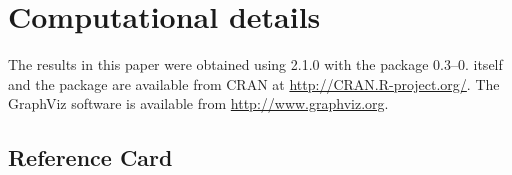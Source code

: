 \documentclass{Z}
\begin{document}
\section*{Computational details}

The results in this paper were obtained using  2.1.0 with
the package  0.3--0.  itself and the
 package are available from CRAN at
\url{http://CRAN.R-project.org/}.  The GraphViz software is available
from \url{http://www.graphviz.org}.




\newpage\mbox{}
\begin{appendix}
\section{Reference Card}
\label{sec:ref}

\end{appendix}
\end{document}
